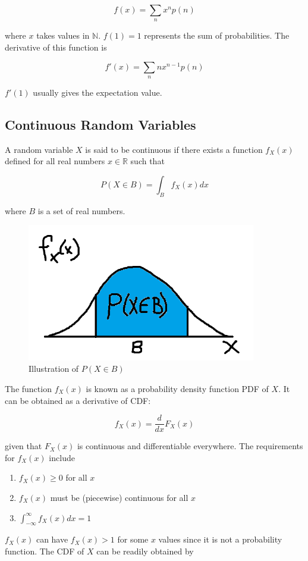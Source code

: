 \documentclass[12pt, a4paper]{article}
\begin{document}
$$f(x)=\sum_n x^n p(n)$$

where $x$ takes values in $\mathbb{N}$. $f(1)=1$ represents the sum of probabilities. The derivative of this function is

$$f'(x)=\sum_n nx^{n-1} p(n)$$

$f'(1)$ usually gives the expectation value.

\subsection{Continuous Random Variables}

A random variable $X$ is said to be continuous if there exists a function $f_X(x)$ defined for all real numbers $x\in\mathbb{R}$ such that

$$P(X\in B)=\int_B f_X(x) dx$$

where $B$ is a set of real numbers.

\begin{figure}[H]
\centering
\includegraphics[width=100mm]{12.png}
\caption{Illustration of $P(X\in B)$}
\end{figure}

The function $f_X(x)$ is known as a probability density function PDF of $X$. It can be obtained as a derivative of CDF:

$$f_X(x)=\frac{d}{dx}F_X(x)$$

given that $F_X(x)$ is continuous and differentiable everywhere. The requirements for $f_X(x)$ include

\begin{enumerate}[i]
  \item $f_X(x) \ge 0$ for all $x$
  \item $f_X(x)$ must be (piecewise) continuous for all $x$
  \item $\displaystyle \int_{-\infty}^\infty f_X(x) dx = 1$
\end{enumerate}

$f_X(x)$ can have $f_X(x)>1$ for some $x$ values since it is not a probability function. The CDF of $X$ can be readily obtained by
\end{document}
